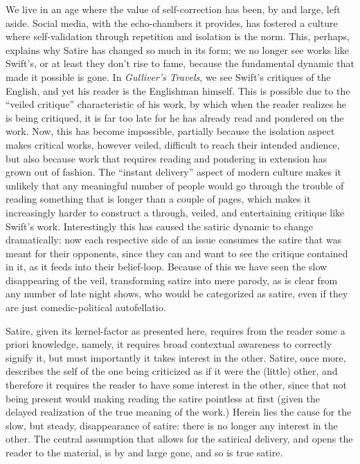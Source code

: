 \documentclass[11pt,letterpaper]{article}
\theoremstyle{definition}
\begin{document}
We live in an age where the value of self-correction has been, by and large, left aside. Social media, with the echo-chambers it provides, has fostered a culture where self-validation through repetition and isolation is the norm. This, perhaps, explains why Satire has changed so much in its form; we no longer see works like Swift's, or at least they don't rise to fame, because the fundamental dynamic that made it possible is gone. In \textit{Gulliver's Travels}, we see Swift's critiques of the English, and yet his reader is the Englishman himself. This is possible due to the ``veiled critique'' characteristic of his work, by which when the reader realizes he is being critiqued, it is far too late for he has already read and pondered on the work. Now, this has become impossible, partially because the isolation aspect makes critical works, however veiled, difficult to reach their intended audience, but also because work that requires reading and pondering in extension has grown out of fashion. The ``instant delivery'' aspect of modern culture makes it unlikely that any meaningful number of people would go through the trouble of reading something that is longer than a couple of pages, which makes it increasingly harder to construct a through, veiled, and entertaining critique like Swift's work. Interestingly this has caused the satiric dynamic to change dramatically: now each respective side of an issue consumes the satire that was meant for their opponents, since they can and want to see the critique contained in it, as it feeds into their belief-loop. Because of this we have seen the slow disappearing of the veil, transforming satire into mere parody, as is clear from any number of late night shows, who would be categorized as satire, even if they are just comedic-political autofellatio.

Satire, given its kernel-factor as presented here, requires from the reader some a priori knowledge, namely, it requires broad contextual awareness to correctly signify it, but must importantly it takes interest in the other. Satire, once more, describes the self of the one being criticized as if it were the (little) other, and therefore it requires the reader to have some interest in the other, since that not being present would making reading the satire pointless at first (given the delayed realization of the true meaning of the work.) Herein lies the cause for the slow, but steady, disappearance of satire: there is no longer any interest in the other. The central assumption that allows for the satirical delivery, and opens the reader to the material, is by and large gone, and so is true satire.

\newpage
\printbibliography[heading=bibintoc,title={Bibliography}]
\end{document}

